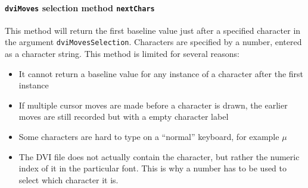 \documentclass[]{article}
\providecommand{\tightlist}{%
  \setlength{\itemsep}{0pt}\setlength{\parskip}{0pt}}
\let\oldparagraph\paragraph
\renewcommand{\paragraph}[1]{\oldparagraph{#1}\mbox{}}
\begin{document}
\paragraph{\texorpdfstring{\texttt{dviMoves} selection method
\texttt{nextChars}}{dviMoves selection method nextChars}}\label{dvimoves-selection-method-nextchars}

This method will return the first baseline value just after a specified
character in the argument \texttt{dviMovesSelection}. Characters are
specified by a number, entered as a character string. This method is
limited for several reasons:

\begin{itemize}
\tightlist
\item
  It cannot return a baseline value for any instance of a character
  after the first instance
\item
  If multiple cursor moves are made before a character is drawn, the
  earlier moves are still recorded but with a empty character label
\item
  Some characters are hard to type on a ``normal'' keyboard, for example
  \(\mu\)
\item
  The DVI file does not actually contain the character, but rather the
  numeric index of it in the particular font. This is why a number has
  to be used to select which character it is.
\end{itemize}
\end{document}
